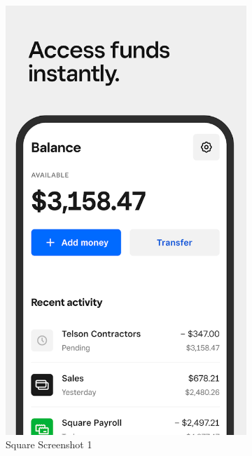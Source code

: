 \begin{figure}[!htb]
    \centering
    \begin{subfigure}[b]{0.32\textwidth}
        \centering
        \includegraphics[width=\textwidth]{images/square_screenshot_1.png}
        \caption{Square Screenshot 1}
        \label{fig:square_1}
    \end{subfigure}
    \hfill
    \begin{subfigure}[b]{0.32\textwidth}
        \centering

\end{subfigure}
\end{figure}
